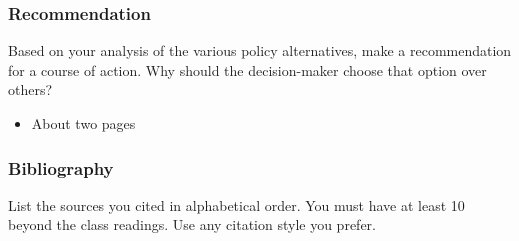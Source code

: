 \hypertarget{recommendation-and-implementation}{%
\subsubsection{Recommendation}\label{recommendation-and-implementation}}

Based on your analysis of the various policy alternatives, make a
recommendation for a course of action. Why should the decision-maker
choose that option over others? 

\begin{itemize}

\item
  About two pages
\end{itemize}

\hypertarget{bibliography}{%
\subsubsection{Bibliography}\label{bibliography}}

List the sources you cited in alphabetical order. You must have at least
10 beyond the class readings. Use any citation style you prefer.



